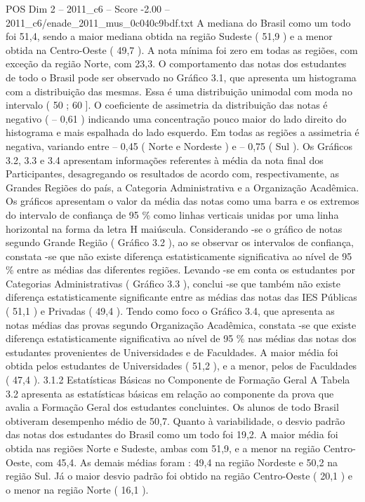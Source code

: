 \begin{textsample}{POS Dim 2 – 2011\_c6 – Score -2.00 – 2011\_c6/enade\_2011\_mus\_0c040c9bdf.txt}
A mediana do Brasil como um todo foi 51,4, sendo a maior mediana obtida na região Sudeste ( 51,9 ) e a menor obtida na Centro-Oeste ( 49,7 ).
A nota mínima foi zero em todas as regiões, com exceção da região Norte, com 23,3.
O comportamento das notas dos estudantes de todo o Brasil pode ser observado no Gráfico 3.1, que apresenta um histograma com a distribuição das mesmas.
Essa é uma distribuição unimodal com moda no intervalo ( 50 ; 60 ].
O coeficiente de assimetria da distribuição das notas é negativo ( – 0,61 ) indicando uma concentração pouco maior do lado direito do histograma e mais espalhada do lado esquerdo.
Em todas as regiões a assimetria é negativa, variando entre – 0,45 ( Norte e Nordeste ) e – 0,75 ( Sul ).
Os Gráficos 3.2, 3.3 e 3.4 apresentam informações referentes à média da nota final dos Participantes, desagregando os resultados de acordo com, respectivamente, as Grandes Regiões do país, a Categoria Administrativa e a Organização Acadêmica.
Os gráficos apresentam o valor da média das notas como uma barra e os extremos do intervalo de confiança de 95 \% como linhas verticais unidas por uma linha horizontal na forma da letra H maiúscula.
Considerando -se o gráfico de notas segundo Grande Região ( Gráfico 3.2 ), ao se observar os intervalos de confiança, constata -se que não existe diferença estatisticamente significativa ao nível de 95 \% entre as médias das diferentes regiões.
Levando -se em conta os estudantes por Categorias Administrativas ( Gráfico 3.3 ), conclui -se que também não existe diferença estatisticamente significante entre as médias das notas das IES Públicas ( 51,1 ) e Privadas ( 49,4 ).
Tendo como foco o Gráfico 3.4, que apresenta as notas médias das provas segundo Organização Acadêmica, constata -se que existe diferença estatisticamente significativa ao nível de 95 \% nas médias das notas dos estudantes provenientes de Universidades e de Faculdades.
A maior média foi obtida pelos estudantes de Universidades ( 51,2 ), e a menor, pelos de Faculdades ( 47,4 ). 3.1.2 Estatísticas Básicas no Componente de Formação Geral A Tabela 3.2 apresenta as estatísticas básicas em relação ao componente da prova que avalia a Formação Geral dos estudantes concluintes.
Os alunos de todo Brasil obtiveram desempenho médio de 50,7.
Quanto à variabilidade, o desvio padrão das notas dos estudantes do Brasil como um todo foi 19,2.
A maior média foi obtida nas regiões Norte e Sudeste, ambas com 51,9, e a menor na região Centro-Oeste, com 45,4.
As demais médias foram : 49,4 na região Nordeste e 50,2 na região Sul.
Já o maior desvio padrão foi obtido na região Centro-Oeste ( 20,1 ) e o menor na região Norte ( 16,1 ).

\end{textsample}
